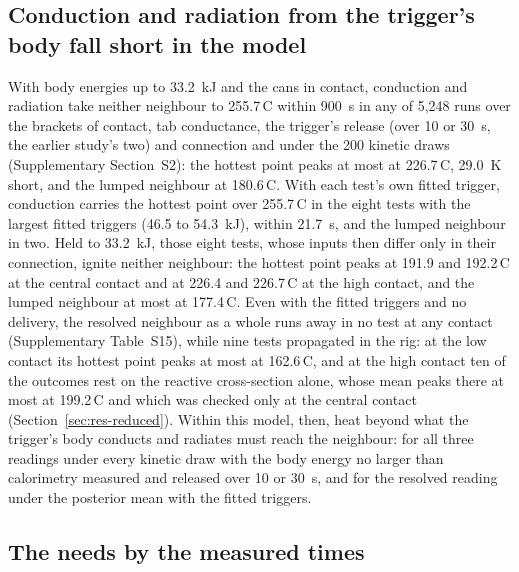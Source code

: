 \documentclass[preprint,12pt]{elsarticle}
\newcommand{\degC}{\,\textdegree C}
\begin{document}
\subsection{Conduction and radiation from the trigger's body fall short in the model}
\label{sec:res-conduction}

With body energies up to 33.2~kJ and the cans in contact, conduction and radiation take neither neighbour to 255.7\degC{} within 900~s in any of 5,248 runs over the brackets of contact, tab conductance, the trigger's release (over 10 or 30~s, the earlier study's two) and connection and under the 200 kinetic draws (Supplementary Section~S2): the hottest point peaks at most at 226.7\degC, 29.0~K short, and the lumped neighbour at 180.6\degC. With each test's own fitted trigger, conduction carries the hottest point over 255.7\degC{} in the eight tests with the largest fitted triggers (46.5 to 54.3~kJ), within 21.7~s, and the lumped neighbour in two. Held to 33.2~kJ, those eight tests, whose inputs then differ only in their connection, ignite neither neighbour: the hottest point peaks at 191.9 and 192.2\degC{} at the central contact and at 226.4 and 226.7\degC{} at the high contact, and the lumped neighbour at most at 177.4\degC. Even with the fitted triggers and no delivery, the resolved neighbour as a whole runs away in no test at any contact (Supplementary Table~S15), while nine tests propagated in the rig: at the low contact its hottest point peaks at most at 162.6\degC, and at the high contact ten of the outcomes rest on the reactive cross-section alone, whose mean peaks there at most at 199.2\degC{} and which was checked only at the central contact (Section~\ref{sec:res-reduced}). Within this model, then, heat beyond what the trigger's body conducts and radiates must reach the neighbour: for all three readings under every kinetic draw with the body energy no larger than calorimetry measured and released over 10 or 30~s, and for the resolved reading under the posterior mean with the fitted triggers.

\subsection{The needs by the measured times}
\label{sec:res-tests}
\end{document}
